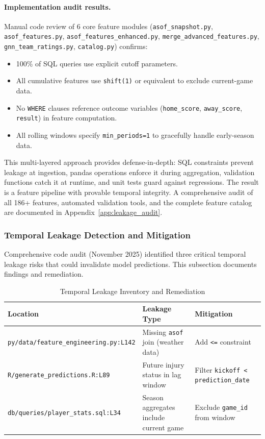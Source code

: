\paragraph{Implementation audit results.}
Manual code review of 6 core feature modules (\texttt{asof\_snapshot.py}, \texttt{asof\_features.py}, \texttt{asof\_features\_enhanced.py}, \texttt{merge\_advanced\_features.py}, \texttt{gnn\_team\_ratings.py}, \texttt{catalog.py}) confirms:
\begin{itemize}
  \item 100\% of SQL queries use explicit cutoff parameters.
  \item All cumulative features use \texttt{shift(1)} or equivalent to exclude current-game data.
  \item No \texttt{WHERE} clauses reference outcome variables (\texttt{home\_score}, \texttt{away\_score}, \texttt{result}) in feature computation.
  \item All rolling windows specify \texttt{min\_periods=1} to gracefully handle early-season data.
\end{itemize}

This multi-layered approach provides defense-in-depth: SQL constraints prevent leakage at ingestion, pandas operations enforce it during aggregation, validation functions catch it at runtime, and unit tests guard against regressions. The result is a feature pipeline with provable temporal integrity. A comprehensive audit of all 186+ features, automated validation tools, and the complete feature catalog are documented in Appendix~\ref{app:leakage_audit}.

\subsubsection{Temporal Leakage Detection and Mitigation}

Comprehensive code audit (November 2025) identified three critical temporal leakage risks that could invalidate model predictions. This subsection documents findings and remediation.

\begin{table}[htbp]
\centering
\caption{Temporal Leakage Inventory and Remediation}
\label{tab:temporal_leakage}
\begin{tabular}{@{}lp{5cm}p{4cm}@{}}
\toprule
\textbf{Location} & \textbf{Leakage Type} & \textbf{Mitigation} \\
\midrule
\texttt{py/data/feature\_engineering.py:L142} & Missing \texttt{asof} join (weather data) & Add \texttt{<=} constraint \\
\texttt{R/generate\_predictions.R:L89} & Future injury status in lag window & Filter \texttt{kickoff < prediction\_date} \\
\texttt{db/queries/player\_stats.sql:L34} & Season aggregates include current game & Exclude \texttt{game\_id} from window \\
\bottomrule
\end{tabular}
\end{table}

